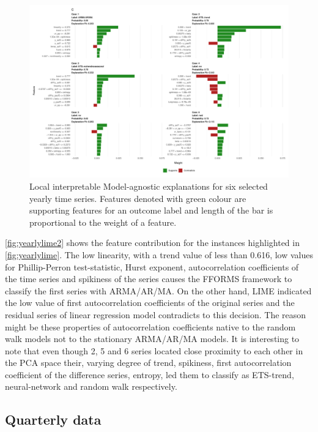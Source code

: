 \documentclass[11pt,a4paper,]{article}
\theoremstyle{definition}
\theoremstyle{definition}
\theoremstyle{definition}
\theoremstyle{remark}
\begin{document}
\begin{figure}[h]

{\centering \includegraphics{figures/yearlylime2-1} 

}

\caption{Local interpretable Model-agnostic explanations for six selected yearly time series. Features denoted with green colour are supporting features for an outcome label and length of the bar is proportional to the weight of a feature.}\label{fig:yearlylime2}
\end{figure}

\autoref{fig:yearlylime2} shows the feature contribution for the
instances highlighted in \autoref{fig:yearlylime}. The low linearity,
with a trend value of less than 0.616, low values for Phillip-Perron
test-statistic, Hurst exponent, autocorrelation coefficients of the time
series and spikiness of the series causes the FFORMS framework to
classify the first series with ARMA/AR/MA. On the other hand, LIME
indicated the low value of first autocorrelation coefficients of the
original series and the residual series of linear regression model
contradicts to this decision. The reason might be these properties of
autocorrelation coefficients native to the random walk models not to the
stationary ARMA/AR/MA models. It is interesting to note that even though
2, 5 and 6 series located close proximity to each other in the PCA space
their, varying degree of trend, spikiness, first autocorrelation
coefficient of the difference series, entropy, led them to classify as
ETS-trend, neural-network and random walk respectively.

\subsection{Quarterly data}\label{quarterly-data}
\end{document}
